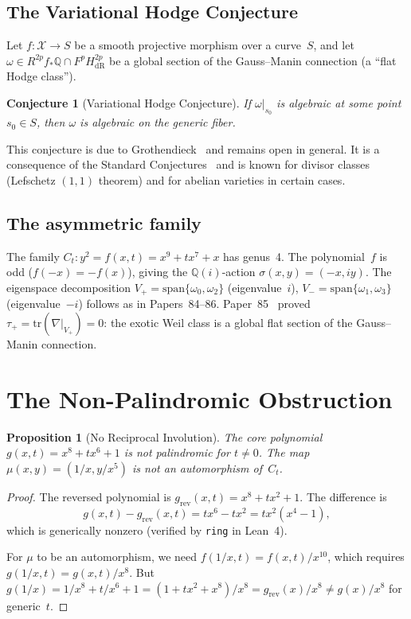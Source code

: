 \documentclass[11pt]{article}
\theoremstyle{plain}
\newtheorem{proposition}[theorem]{Proposition}
\newtheorem{conjecture}[theorem]{Conjecture}
\theoremstyle{definition}
\theoremstyle{remark}
\newcommand{\Q}{\mathbb{Q}}
\newcommand{\tr}{\mathrm{tr}}
\begin{document}
\subsection{The Variational Hodge Conjecture}

Let $f\colon \mathcal{X} \to S$ be a smooth projective morphism
over a curve~$S$, and let
$\omega \in R^{2p} f_* \Q \cap F^p H^{2p}_{\mathrm{dR}}$
be a global section of the Gauss--Manin connection (a ``flat
Hodge class'').

\begin{conjecture}[Variational Hodge Conjecture]
\label{conj:VHC}
If $\omega|_{s_0}$ is algebraic at some point $s_0 \in S$,
then $\omega$ is algebraic on the generic fiber.
\end{conjecture}

This conjecture is due to Grothendieck~\cite{Grothendieck66}
and remains open in general.  It is a consequence of the
Standard Conjectures~\cite{Kleiman68} and is known for
divisor classes (Lefschetz $(1,1)$ theorem) and for abelian
varieties in certain cases.

\subsection{The asymmetric family}

The family $C_t\colon y^2 = f(x,t) = x^9 + tx^7 + x$ has genus~4.
The polynomial~$f$ is odd ($f(-x) = -f(x)$), giving the $\Q(i)$-action
$\sigma(x,y) = (-x, iy)$.  The eigenspace decomposition
$V_+ = \mathrm{span}\{\omega_0, \omega_2\}$ (eigenvalue~$i$),
$V_- = \mathrm{span}\{\omega_1, \omega_3\}$ (eigenvalue~$-i$)
follows as in Papers~84--86.  Paper~85~\cite{P85} proved
$\tau_+ = \tr(\nabla|_{V_+}) = 0$: the exotic Weil class is a
global flat section of the Gauss--Manin connection.

\section{The Non-Palindromic Obstruction}
\label{sec:obstruction}

\begin{proposition}[No Reciprocal Involution]\label{prop:no-mu}
The core polynomial $g(x,t) = x^8 + tx^6 + 1$ is not palindromic
for $t \neq 0$.  The map $\mu(x,y) = (1/x, y/x^5)$ is \emph{not}
an automorphism of~$C_t$.
\end{proposition}

\begin{proof}
The reversed polynomial is $g_{\mathrm{rev}}(x,t) = x^8 + tx^2 + 1$.
The difference is
\[
  g(x,t) - g_{\mathrm{rev}}(x,t) = tx^6 - tx^2 = tx^2(x^4 - 1),
\]
which is generically nonzero (verified by \texttt{ring} in Lean~4).

For $\mu$ to be an automorphism, we need
$f(1/x, t) = f(x,t)/x^{10}$, which requires
$g(1/x, t) = g(x,t)/x^8$.  But
$g(1/x) = 1/x^8 + t/x^6 + 1 = (1 + tx^2 + x^8)/x^8
= g_{\mathrm{rev}}(x)/x^8 \neq g(x)/x^8$
for generic~$t$.
\end{proof}
\end{document}
